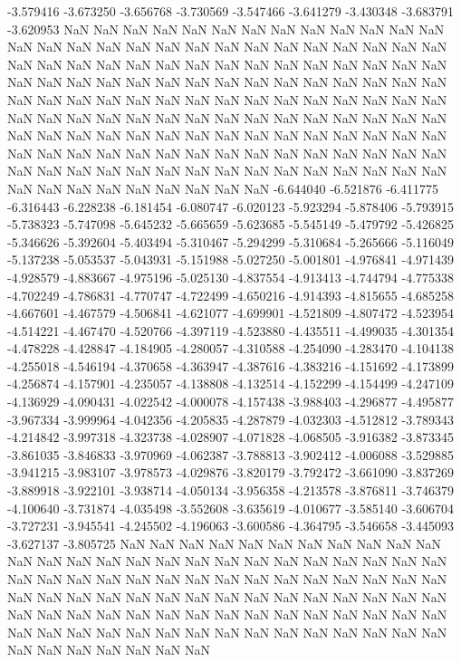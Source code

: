 -3.579416
-3.673250
-3.656768
-3.730569
-3.547466
-3.641279
-3.430348
-3.683791
-3.620953
NaN
NaN
NaN
NaN
NaN
NaN
NaN
NaN
NaN
NaN
NaN
NaN
NaN
NaN
NaN
NaN
NaN
NaN
NaN
NaN
NaN
NaN
NaN
NaN
NaN
NaN
NaN
NaN
NaN
NaN
NaN
NaN
NaN
NaN
NaN
NaN
NaN
NaN
NaN
NaN
NaN
NaN
NaN
NaN
NaN
NaN
NaN
NaN
NaN
NaN
NaN
NaN
NaN
NaN
NaN
NaN
NaN
NaN
NaN
NaN
NaN
NaN
NaN
NaN
NaN
NaN
NaN
NaN
NaN
NaN
NaN
NaN
NaN
NaN
NaN
NaN
NaN
NaN
NaN
NaN
NaN
NaN
NaN
NaN
NaN
NaN
NaN
NaN
NaN
NaN
NaN
NaN
NaN
NaN
NaN
NaN
NaN
NaN
NaN
NaN
NaN
NaN
NaN
NaN
NaN
NaN
NaN
NaN
NaN
NaN
NaN
NaN
NaN
NaN
NaN
NaN
NaN
NaN
NaN
NaN
NaN
NaN
NaN
NaN
NaN
NaN
NaN
NaN
NaN
NaN
NaN
NaN
NaN
NaN
NaN
NaN
NaN
NaN
NaN
NaN
NaN
NaN
-6.644040
-6.521876
-6.411775
-6.316443
-6.228238
-6.181454
-6.080747
-6.020123
-5.923294
-5.878406
-5.793915
-5.738323
-5.747098
-5.645232
-5.665659
-5.623685
-5.545149
-5.479792
-5.426825
-5.346626
-5.392604
-5.403494
-5.310467
-5.294299
-5.310684
-5.265666
-5.116049
-5.137238
-5.053537
-5.043931
-5.151988
-5.027250
-5.001801
-4.976841
-4.971439
-4.928579
-4.883667
-4.975196
-5.025130
-4.837554
-4.913413
-4.744794
-4.775338
-4.702249
-4.786831
-4.770747
-4.722499
-4.650216
-4.914393
-4.815655
-4.685258
-4.667601
-4.467579
-4.506841
-4.621077
-4.699901
-4.521809
-4.807472
-4.523954
-4.514221
-4.467470
-4.520766
-4.397119
-4.523880
-4.435511
-4.499035
-4.301354
-4.478228
-4.428847
-4.184905
-4.280057
-4.310588
-4.254090
-4.283470
-4.104138
-4.255018
-4.546194
-4.370658
-4.363947
-4.387616
-4.383216
-4.151692
-4.173899
-4.256874
-4.157901
-4.235057
-4.138808
-4.132514
-4.152299
-4.154499
-4.247109
-4.136929
-4.090431
-4.022542
-4.000078
-4.157438
-3.988403
-4.296877
-4.495877
-3.967334
-3.999964
-4.042356
-4.205835
-4.287879
-4.032303
-4.512812
-3.789343
-4.214842
-3.997318
-4.323738
-4.028907
-4.071828
-4.068505
-3.916382
-3.873345
-3.861035
-3.846833
-3.970969
-4.062387
-3.788813
-3.902412
-4.006088
-3.529885
-3.941215
-3.983107
-3.978573
-4.029876
-3.820179
-3.792472
-3.661090
-3.837269
-3.889918
-3.922101
-3.938714
-4.050134
-3.956358
-4.213578
-3.876811
-3.746379
-4.100640
-3.731874
-4.035498
-3.552608
-3.635619
-4.010677
-3.585140
-3.606704
-3.727231
-3.945541
-4.245502
-4.196063
-3.600586
-4.364795
-3.546658
-3.445093
-3.627137
-3.805725
NaN
NaN
NaN
NaN
NaN
NaN
NaN
NaN
NaN
NaN
NaN
NaN
NaN
NaN
NaN
NaN
NaN
NaN
NaN
NaN
NaN
NaN
NaN
NaN
NaN
NaN
NaN
NaN
NaN
NaN
NaN
NaN
NaN
NaN
NaN
NaN
NaN
NaN
NaN
NaN
NaN
NaN
NaN
NaN
NaN
NaN
NaN
NaN
NaN
NaN
NaN
NaN
NaN
NaN
NaN
NaN
NaN
NaN
NaN
NaN
NaN
NaN
NaN
NaN
NaN
NaN
NaN
NaN
NaN
NaN
NaN
NaN
NaN
NaN
NaN
NaN
NaN
NaN
NaN
NaN
NaN
NaN
NaN
NaN
NaN
NaN
NaN
NaN
NaN
NaN
NaN
NaN
NaN
